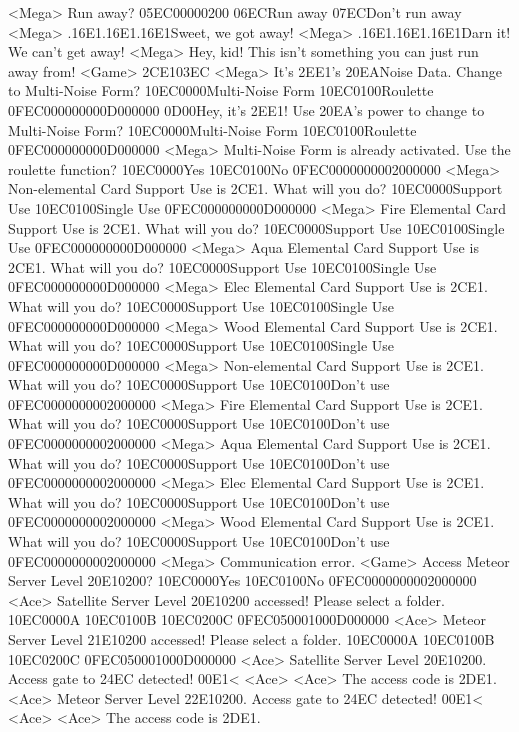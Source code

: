 <Mega> Run away? {05}{EC}{00}{00}{02}{00}  {06}{EC}Run away  {07}{EC}Don't run away 
<Mega> .{16}{E1}.{16}{E1}.{16}{E1}Sweet, we got away! 
<Mega> .{16}{E1}.{16}{E1}.{16}{E1}Darn it! We can't get away! 
<Mega> Hey, kid! This isn't something you can just run away from! 
<Game> {2C}{E1}{03}{EC}
<Mega> It's {2E}{E1}'s {20}{EA}Noise Data. Change to Multi-Noise Form? {10}{EC}{00}{00}Multi-Noise Form {10}{EC}{01}{00}Roulette {0F}{EC}{00}{00}{00}{00}{0D}{00}{00}{00}
{0D}{00}Hey, it's {2E}{E1}! Use {20}{EA}'s power to change to Multi-Noise Form? {10}{EC}{00}{00}Multi-Noise Form {10}{EC}{01}{00}Roulette {0F}{EC}{00}{00}{00}{00}{0D}{00}{00}{00}
<Mega> Multi-Noise Form is already activated. Use the roulette function? {10}{EC}{00}{00}Yes {10}{EC}{01}{00}No {0F}{EC}{00}{00}{00}{00}{02}{00}{00}{00}
<Mega> Non-elemental Card Support Use is {2C}{E1}. What will you do? {10}{EC}{00}{00}Support Use {10}{EC}{01}{00}Single Use {0F}{EC}{00}{00}{00}{00}{0D}{00}{00}{00}
<Mega> Fire Elemental Card Support Use is {2C}{E1}. What will you do? {10}{EC}{00}{00}Support Use {10}{EC}{01}{00}Single Use {0F}{EC}{00}{00}{00}{00}{0D}{00}{00}{00}
<Mega> Aqua Elemental Card Support Use is {2C}{E1}. What will you do? {10}{EC}{00}{00}Support Use {10}{EC}{01}{00}Single Use {0F}{EC}{00}{00}{00}{00}{0D}{00}{00}{00}
<Mega> Elec Elemental Card Support Use is {2C}{E1}. What will you do? {10}{EC}{00}{00}Support Use {10}{EC}{01}{00}Single Use {0F}{EC}{00}{00}{00}{00}{0D}{00}{00}{00}
<Mega> Wood Elemental Card Support Use is {2C}{E1}. What will you do? {10}{EC}{00}{00}Support Use {10}{EC}{01}{00}Single Use {0F}{EC}{00}{00}{00}{00}{0D}{00}{00}{00}
<Mega> Non-elemental Card Support Use is {2C}{E1}. What will you do? {10}{EC}{00}{00}Support Use {10}{EC}{01}{00}Don't use {0F}{EC}{00}{00}{00}{00}{02}{00}{00}{00}
<Mega> Fire Elemental Card Support Use is {2C}{E1}. What will you do? {10}{EC}{00}{00}Support Use {10}{EC}{01}{00}Don't use {0F}{EC}{00}{00}{00}{00}{02}{00}{00}{00}
<Mega> Aqua Elemental Card Support Use is {2C}{E1}. What will you do? {10}{EC}{00}{00}Support Use {10}{EC}{01}{00}Don't use {0F}{EC}{00}{00}{00}{00}{02}{00}{00}{00}
<Mega> Elec Elemental Card Support Use is {2C}{E1}. What will you do? {10}{EC}{00}{00}Support Use {10}{EC}{01}{00}Don't use {0F}{EC}{00}{00}{00}{00}{02}{00}{00}{00}
<Mega> Wood Elemental Card Support Use is {2C}{E1}. What will you do? {10}{EC}{00}{00}Support Use {10}{EC}{01}{00}Don't use {0F}{EC}{00}{00}{00}{00}{02}{00}{00}{00}
<Mega> Communication error. 
<Game> Access Meteor Server Level {20}{E1}{02}{00}? {10}{EC}{00}{00}Yes {10}{EC}{01}{00}No {0F}{EC}{00}{00}{00}{00}{02}{00}{00}{00}
<Ace> Satellite Server Level {20}{E1}{02}{00} accessed! Please select a folder. {10}{EC}{00}{00}A {10}{EC}{01}{00}B {10}{EC}{02}{00}C {0F}{EC}{05}{00}{01}{00}{0D}{00}{00}{00}
<Ace> Meteor Server Level {21}{E1}{02}{00} accessed! Please select a folder. {10}{EC}{00}{00}A {10}{EC}{01}{00}B {10}{EC}{02}{00}C {0F}{EC}{05}{00}{01}{00}{0D}{00}{00}{00}
<Ace> Satellite Server Level {20}{E1}{02}{00}. Access gate to {24}{EC} detected! {00}{E1}< <Ace> 
<Ace> The access code is {2D}{E1}. 
<Ace> Meteor Server Level {22}{E1}{02}{00}. Access gate to {24}{EC} detected! {00}{E1}< <Ace> 
<Ace> The access code is {2D}{E1}. 
